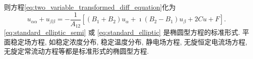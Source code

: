 \begin{enumerate}
则方程\eqref{eq:two_variable_transformed_diff_equation}化为
\begin{equation}
    u_{\alpha \alpha}+u_{\beta \beta}=-\frac{1}{A_{12}}\left[\left(B_1+B_2\right) u_\alpha+\imath\left(B_2-B_1\right) u_\beta+2 C u+F\right] .
    \label{eq:standard_elliptic}
\end{equation}
\eqref{eq:standard_elliptic_semi} 或 \eqref{eq:standard_elliptic} 是椭圆型方程的标准形式. 
平面稳定场方程, 如稳定浓度分布, 稳定温度分布, 静电场方程, 无旋恒定电流场方程, 无旋定常流动方程等都是标准形式的椭圆型方程.
\end{enumerate}


